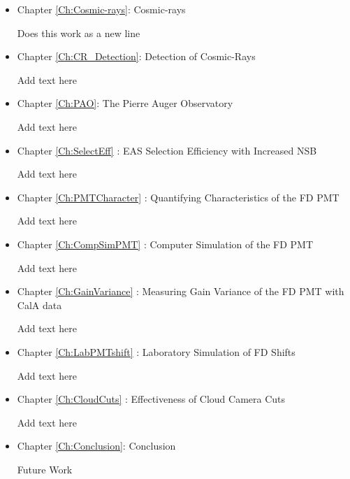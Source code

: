 \begin{itemize}
\item  Chapter \ref{Ch:Cosmic-rays}: Cosmic-rays

Does this work as a new line

\item Chapter \ref{Ch:CR_Detection}: Detection of Cosmic-Rays

Add text here

\item Chapter \ref{Ch:PAO}: The Pierre Auger Observatory

Add text here

\item Chapter \ref{Ch:SelectEff} : EAS Selection Efficiency with Increased NSB 

Add text here

\item Chapter \ref{Ch:PMTCharacter} : Quantifying Characteristics of the FD PMT 

Add text here

\item Chapter \ref{Ch:CompSimPMT} : Computer Simulation of the FD PMT 

Add text here

\item Chapter \ref{Ch:GainVariance} : Measuring Gain Variance of the FD PMT with CalA data 

Add text here

\item Chapter \ref{Ch:LabPMTshift} : Laboratory Simulation of FD Shifts

Add text here

\item Chapter \ref{Ch:CloudCuts} : Effectiveness of Cloud Camera Cuts

Add text here

\item Chapter \ref{Ch:Conclusion}: Conclusion 

Future Work


\end{itemize}